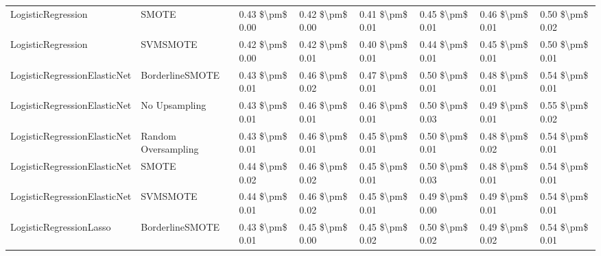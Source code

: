 \begin{tabular}{llllllll}
             LogisticRegression &                         SMOTE & 0.43 \$\textbackslash pm\$ 0.00 &           0.42 \$\textbackslash pm\$ 0.00 &       0.41 \$\textbackslash pm\$ 0.01 &        0.45 \$\textbackslash pm\$ 0.01 &                         0.46 \$\textbackslash pm\$ 0.01 &     0.50 \$\textbackslash pm\$ 0.02 \\
             LogisticRegression &                      SVMSMOTE & 0.42 \$\textbackslash pm\$ 0.00 &           0.42 \$\textbackslash pm\$ 0.01 &       0.40 \$\textbackslash pm\$ 0.01 &        0.44 \$\textbackslash pm\$ 0.01 &                         0.45 \$\textbackslash pm\$ 0.01 &     0.50 \$\textbackslash pm\$ 0.01 \\
   LogisticRegressionElasticNet &               BorderlineSMOTE & 0.43 \$\textbackslash pm\$ 0.01 &           0.46 \$\textbackslash pm\$ 0.02 &       0.47 \$\textbackslash pm\$ 0.01 &        0.50 \$\textbackslash pm\$ 0.01 &                         0.48 \$\textbackslash pm\$ 0.01 &     0.54 \$\textbackslash pm\$ 0.01 \\
   LogisticRegressionElasticNet &                 No Upsampling & 0.43 \$\textbackslash pm\$ 0.01 &           0.46 \$\textbackslash pm\$ 0.01 &       0.46 \$\textbackslash pm\$ 0.01 &        0.50 \$\textbackslash pm\$ 0.03 &                         0.49 \$\textbackslash pm\$ 0.01 &     0.55 \$\textbackslash pm\$ 0.02 \\
   LogisticRegressionElasticNet &           Random Oversampling & 0.43 \$\textbackslash pm\$ 0.01 &           0.46 \$\textbackslash pm\$ 0.01 &       0.45 \$\textbackslash pm\$ 0.01 &        0.50 \$\textbackslash pm\$ 0.01 &                         0.48 \$\textbackslash pm\$ 0.02 &     0.54 \$\textbackslash pm\$ 0.01 \\
   LogisticRegressionElasticNet &                         SMOTE & 0.44 \$\textbackslash pm\$ 0.02 &           0.46 \$\textbackslash pm\$ 0.02 &       0.45 \$\textbackslash pm\$ 0.01 &        0.50 \$\textbackslash pm\$ 0.03 &                         0.48 \$\textbackslash pm\$ 0.01 &     0.54 \$\textbackslash pm\$ 0.01 \\
   LogisticRegressionElasticNet &                      SVMSMOTE & 0.44 \$\textbackslash pm\$ 0.01 &           0.46 \$\textbackslash pm\$ 0.02 &       0.45 \$\textbackslash pm\$ 0.01 &        0.49 \$\textbackslash pm\$ 0.00 &                         0.49 \$\textbackslash pm\$ 0.01 &     0.54 \$\textbackslash pm\$ 0.01 \\
        LogisticRegressionLasso &               BorderlineSMOTE & 0.43 \$\textbackslash pm\$ 0.01 &           0.45 \$\textbackslash pm\$ 0.00 &       0.45 \$\textbackslash pm\$ 0.02 &        0.50 \$\textbackslash pm\$ 0.02 &                         0.49 \$\textbackslash pm\$ 0.02 &     0.54 \$\textbackslash pm\$ 0.01 \\

\end{tabular}
